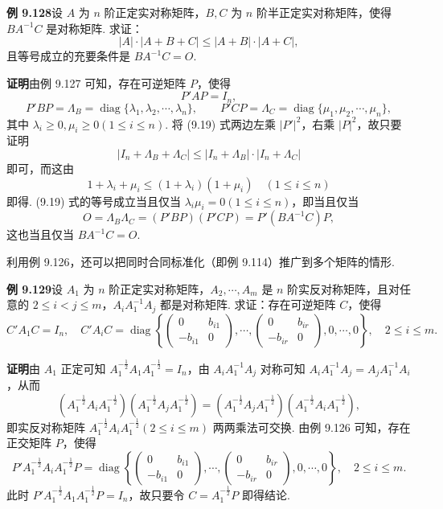 \documentclass[UTF8, 12pt, fontset=fandol, oneside]{ctexart}
\begin{document}
\noindent\textbf{例 9.128}\quad 设 $A$ 为 $n$ 阶正定实对称矩阵，$B,C$ 为 $n$ 阶半正定实对称矩阵，使得 $BA^{-1}C$ 是对称矩阵. 求证：
\begin{equation}
|A|\cdot|A+B+C|\le |A+B|\cdot|A+C|,
\tag{9.19}
\end{equation}
且等号成立的充要条件是 $BA^{-1}C=O$.

\noindent\textbf{证明}\quad 由例 9.127 可知，存在可逆矩阵 $P$，使得
\[
P'AP=I_n,
\]
\[
P'BP=\Lambda_B=\operatorname{diag}\{\lambda_1,\lambda_2,\cdots,\lambda_n\},\qquad
P'CP=\Lambda_C=\operatorname{diag}\{\mu_1,\mu_2,\cdots,\mu_n\},
\]
其中 $\lambda_i\ge0,\mu_i\ge0(1\le i\le n)$. 将 (9.19) 式两边左乘 $|P'|^2$，右乘 $|P|^2$，故只要证明
\[
|I_n+\Lambda_B+\Lambda_C|\le |I_n+\Lambda_B|\cdot|I_n+\Lambda_C|
\]
即可，而这由
\[
1+\lambda_i+\mu_i\le(1+\lambda_i)(1+\mu_i)\quad (1\le i\le n)
\]
即得. (9.19) 式的等号成立当且仅当 $\lambda_i\mu_i=0(1\le i\le n)$，即当且仅当
\[
O=\Lambda_B\Lambda_C=(P'BP)(P'CP)=P'(BA^{-1}C)P,
\]
这也当且仅当 $BA^{-1}C=O$.

利用例 9.126，还可以把同时合同标准化（即例 9.114）推广到多个矩阵的情形.

\noindent\textbf{例 9.129}\quad 设 $A_1$ 为 $n$ 阶正定实对称矩阵，$A_2,\cdots,A_m$ 是 $n$ 阶实反对称矩阵，且对任意的 $2\le i<j\le m$，$A_iA_1^{-1}A_j$ 都是对称矩阵. 求证：存在可逆矩阵 $C$，使得
\[
C'A_1C=I_n,\quad
C'A_iC=\operatorname{diag}\left\{
\begin{pmatrix}
0&b_{i1}\\
-b_{i1}&0
\end{pmatrix},\cdots,
\begin{pmatrix}
0&b_{ir}\\
-b_{ir}&0
\end{pmatrix},
0,\cdots,0
\right\},\quad 2\le i\le m.
\]

\noindent\textbf{证明}\quad 由 $A_1$ 正定可知 $A_1^{-\frac12}A_1A_1^{-\frac12}=I_n$，由 $A_iA_1^{-1}A_j$ 对称可知 $A_iA_1^{-1}A_j=A_jA_1^{-1}A_i$，从而
\[
(A_1^{-\frac12}A_iA_1^{-\frac12})(A_1^{-\frac12}A_jA_1^{-\frac12})
=(A_1^{-\frac12}A_jA_1^{-\frac12})(A_1^{-\frac12}A_iA_1^{-\frac12}),
\]
即实反对称矩阵 $A_1^{-\frac12}A_iA_1^{-\frac12}(2\le i\le m)$ 两两乘法可交换. 由例 9.126 可知，存在正交矩阵 $P$，使得
\[
P'A_1^{-\frac12}A_iA_1^{-\frac12}P=\operatorname{diag}\left\{
\begin{pmatrix}
0&b_{i1}\\
-b_{i1}&0
\end{pmatrix},\cdots,
\begin{pmatrix}
0&b_{ir}\\
-b_{ir}&0
\end{pmatrix},
0,\cdots,0
\right\},\quad 2\le i\le m.
\]
此时 $P'A_1^{-\frac12}A_1A_1^{-\frac12}P=I_n$，故只要令 $C=A_1^{-\frac12}P$ 即得结论.
\end{document}

